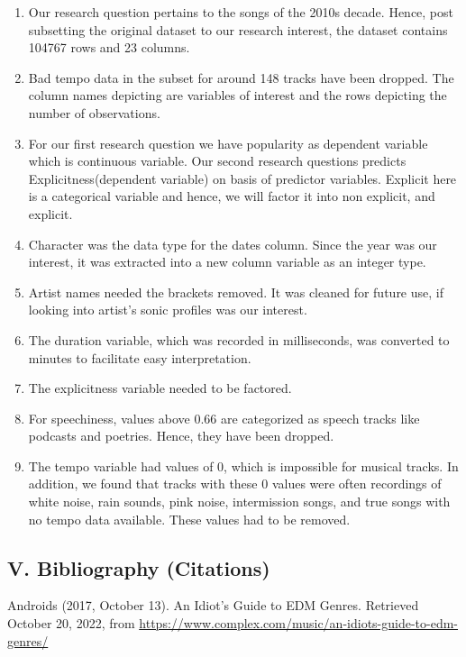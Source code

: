 \documentclass[
]{article}
\begin{document}
\begin{enumerate}
\def\labelenumi{\arabic{enumi}.}
\item
  Our research question pertains to the songs of the 2010s decade.
  Hence, post subsetting the original dataset to our research interest,
  the dataset contains 104767 rows and 23 columns.
\item
  Bad tempo data in the subset for around 148 tracks have been dropped.
  The column names depicting are variables of interest and the rows
  depicting the number of observations.
\item
  For our first research question we have popularity as dependent
  variable which is continuous variable. Our second research questions
  predicts Explicitness(dependent variable) on basis of predictor
  variables. Explicit here is a categorical variable and hence, we will
  factor it into non explicit, and explicit.
\item
  Character was the data type for the dates column. Since the year was
  our interest, it was extracted into a new column variable as an
  integer type.
\item
  Artist names needed the brackets removed. It was cleaned for future
  use, if looking into artist's sonic profiles was our interest.
\item
  The duration variable, which was recorded in milliseconds, was
  converted to minutes to facilitate easy interpretation.
\item
  The explicitness variable needed to be factored.
\item
  For speechiness, values above 0.66 are categorized as speech tracks
  like podcasts and poetries. Hence, they have been dropped.
\item
  The tempo variable had values of 0, which is impossible for musical
  tracks. In addition, we found that tracks with these 0 values were
  often recordings of white noise, rain sounds, pink noise, intermission
  songs, and true songs with no tempo data available. These values had
  to be removed.
\end{enumerate}

\hypertarget{v.-bibliography-citations}{%
\subsection{V. Bibliography
(Citations)}\label{v.-bibliography-citations}}

Androids (2017, October 13). An Idiot's Guide to EDM Genres. Retrieved
October 20, 2022, from
\url{https://www.complex.com/music/an-idiots-guide-to-edm-genres/}
\end{document}
